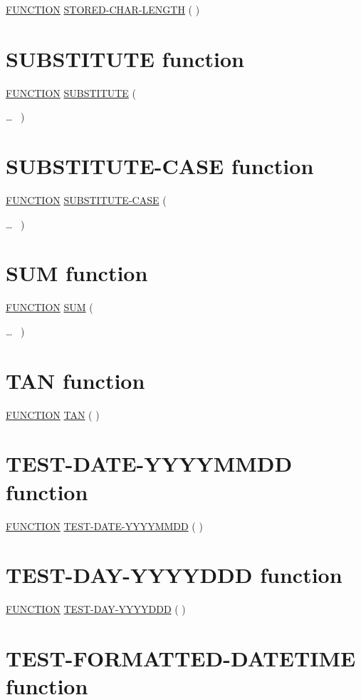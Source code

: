 \documentclass[a4paper,oneside,svgnames]{scrbook}
\makeatletter
\newcommand{\key}[1]{\underline{#1}}
\newcommand{\gnucobol}[1]{%
  \colorbox{orange!75}{#1}}
\newenvironment{1=}{$\left\{ \begin{tabular}{@{}l@{}}}{\end{tabular} \right\}$}
\makeatother
\begin{document}
\gnucobol{
  \key{FUNCTION} \key{STORED-CHAR-LENGTH} ( \argument )
}

\section{SUBSTITUTE function}

\gnucobol{
  \key{FUNCTION} \key{SUBSTITUTE} ( \argument
  \begin{1=}
    \argument \argument
  \end{1=}\ldots\ {}
  )
}

\section{SUBSTITUTE-CASE function}

\gnucobol{
  \key{FUNCTION} \key{SUBSTITUTE-CASE} ( \argument
  \begin{1=}
    \argument \argument
  \end{1=}\ldots\ {}
  )
}

\section{SUM function}

\key{FUNCTION} \key{SUM} (
\begin{1=}
  \argument
\end{1=}\ldots
\ {})

\section{TAN function}

\key{FUNCTION} \key{TAN} ( \argument )

\section{TEST-DATE-YYYYMMDD function}

\key{FUNCTION} \key{TEST-DATE-YYYYMMDD} ( \argument )

\section{TEST-DAY-YYYYDDD function}

\key{FUNCTION} \key{TEST-DAY-YYYYDDD} ( \argument )

\section{TEST-FORMATTED-DATETIME function}
\end{document}
